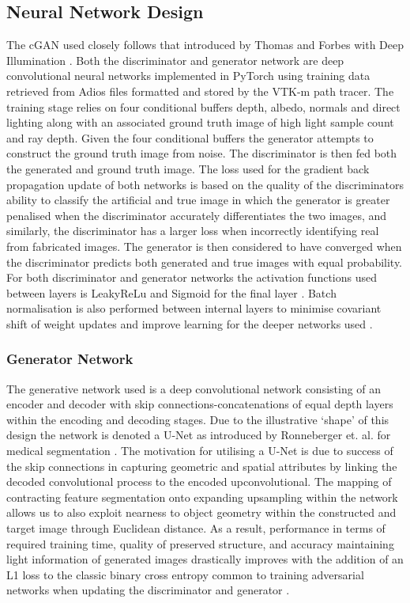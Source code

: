\documentclass[sigconf,authordraft]{acmart}%
\begin{document}
\subsection{Neural Network Design}

The cGAN used closely follows that introduced by Thomas and Forbes with Deep Illumination \cite{deepillum}. Both the discriminator and generator network are deep convolutional neural networks implemented in PyTorch using training data retrieved from Adios files formatted and stored by the VTK-m path tracer. The training stage relies on four conditional buffers depth, albedo, normals and direct lighting along with an associated ground truth image of high light sample count and ray depth. Given the four conditional buffers the generator attempts to construct the ground truth image from noise. The discriminator is then fed both the generated and ground truth image. The loss used for the gradient back propagation update of both networks is based on the quality of the discriminators ability to classify the artificial and true image in which the generator is greater penalised when the discriminator accurately differentiates the two images, and similarly, the discriminator has a larger loss when incorrectly identifying real from fabricated images. The generator is then considered to have converged when the discriminator predicts both generated and true images with equal probability. For both discriminator and generator networks the activation functions used between layers is LeakyReLu and Sigmoid for the final layer \cite{maasLeaky}. Batch normalisation is also performed between internal layers to minimise covariant shift of weight updates and improve learning for the deeper networks used \cite{ioffeBatch}.

\subsubsection{Generator Network}

The generative network used is a deep convolutional network consisting of an encoder and decoder with skip connections-concatenations of equal depth layers within the encoding and decoding stages. Due to the illustrative `shape' of this design the network is denoted a U-Net as introduced by Ronneberger et. al. for medical segmentation \cite{ronnebergerUnet}. The motivation for utilising a U-Net is due to success of the skip connections in capturing geometric and spatial attributes by linking the decoded convolutional process to the encoded upconvolutional. The mapping of contracting feature segmentation onto expanding upsampling within the network allows us to also exploit nearness to object geometry within the constructed and target image through Euclidean distance. As a result, performance in terms of required training time, quality of preserved structure, and accuracy maintaining light information of generated images drastically improves with the addition of an L1 loss to the classic binary cross entropy common to training adversarial networks when updating the discriminator and generator  \cite{isolaL1}\cite{goodfellowGAN}. 
\end{document}
